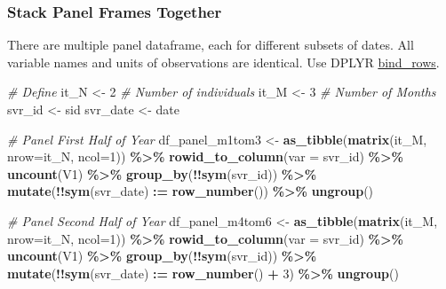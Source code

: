 \documentclass[
]{book}
\newenvironment{Shaded}{\begin{snugshade}}{\end{snugshade}}
\newcommand{\CommentTok}[1]{\textcolor[rgb]{0.56,0.35,0.01}{\textit{#1}}}
\newcommand{\DataTypeTok}[1]{\textcolor[rgb]{0.13,0.29,0.53}{#1}}
\newcommand{\DecValTok}[1]{\textcolor[rgb]{0.00,0.00,0.81}{#1}}
\newcommand{\ErrorTok}[1]{\textcolor[rgb]{0.64,0.00,0.00}{\textbf{#1}}}
\newcommand{\KeywordTok}[1]{\textcolor[rgb]{0.13,0.29,0.53}{\textbf{#1}}}
\newcommand{\NormalTok}[1]{#1}
\newcommand{\OperatorTok}[1]{\textcolor[rgb]{0.81,0.36,0.00}{\textbf{#1}}}
\newcommand{\StringTok}[1]{\textcolor[rgb]{0.31,0.60,0.02}{#1}}
\begin{document}
\hypertarget{stack-panel-frames-together}{%
\subsubsection{Stack Panel Frames Together}\label{stack-panel-frames-together}}

There are multiple panel dataframe, each for different subsets of dates. All variable names and units of observations are identical. Use DPLYR \href{https://dplyr.tidyverse.org/reference/bind.html}{bind\_rows}.

\begin{Shaded}
\begin{Highlighting}[]
\CommentTok{\# Define}
\NormalTok{it\_N \textless{}{-}}\StringTok{ }\DecValTok{2} \CommentTok{\# Number of individuals}
\NormalTok{it\_M \textless{}{-}}\StringTok{ }\DecValTok{3} \CommentTok{\# Number of Months}
\NormalTok{svr\_id \textless{}{-}}\StringTok{ \textquotesingle{}sid\textquotesingle{}}
\NormalTok{svr\_date \textless{}{-}}\StringTok{ \textquotesingle{}date\textquotesingle{}}

\CommentTok{\# Panel First Half of Year}
\NormalTok{df\_panel\_m1tom3 \textless{}{-}}\StringTok{ }\KeywordTok{as\_tibble}\NormalTok{(}\KeywordTok{matrix}\NormalTok{(it\_M, }\DataTypeTok{nrow=}\NormalTok{it\_N, }\DataTypeTok{ncol=}\DecValTok{1}\NormalTok{)) }\OperatorTok{\%\textgreater{}\%}
\StringTok{  }\KeywordTok{rowid\_to\_column}\NormalTok{(}\DataTypeTok{var =}\NormalTok{ svr\_id) }\OperatorTok{\%\textgreater{}\%}
\StringTok{  }\KeywordTok{uncount}\NormalTok{(V1) }\OperatorTok{\%\textgreater{}\%}
\StringTok{  }\KeywordTok{group\_by}\NormalTok{(}\OperatorTok{!!}\KeywordTok{sym}\NormalTok{(svr\_id)) }\OperatorTok{\%\textgreater{}\%}\StringTok{ }\KeywordTok{mutate}\NormalTok{(}\OperatorTok{!!}\KeywordTok{sym}\NormalTok{(svr\_date) }\OperatorTok{:}\ErrorTok{=}\StringTok{ }\KeywordTok{row\_number}\NormalTok{()) }\OperatorTok{\%\textgreater{}\%}
\StringTok{  }\KeywordTok{ungroup}\NormalTok{()}

\CommentTok{\# Panel Second Half of Year}
\NormalTok{df\_panel\_m4tom6 \textless{}{-}}\StringTok{ }\KeywordTok{as\_tibble}\NormalTok{(}\KeywordTok{matrix}\NormalTok{(it\_M, }\DataTypeTok{nrow=}\NormalTok{it\_N, }\DataTypeTok{ncol=}\DecValTok{1}\NormalTok{)) }\OperatorTok{\%\textgreater{}\%}
\StringTok{  }\KeywordTok{rowid\_to\_column}\NormalTok{(}\DataTypeTok{var =}\NormalTok{ svr\_id) }\OperatorTok{\%\textgreater{}\%}
\StringTok{  }\KeywordTok{uncount}\NormalTok{(V1) }\OperatorTok{\%\textgreater{}\%}
\StringTok{  }\KeywordTok{group\_by}\NormalTok{(}\OperatorTok{!!}\KeywordTok{sym}\NormalTok{(svr\_id)) }\OperatorTok{\%\textgreater{}\%}\StringTok{ }\KeywordTok{mutate}\NormalTok{(}\OperatorTok{!!}\KeywordTok{sym}\NormalTok{(svr\_date) }\OperatorTok{:}\ErrorTok{=}\StringTok{ }\KeywordTok{row\_number}\NormalTok{() }\OperatorTok{+}\StringTok{ }\DecValTok{3}\NormalTok{) }\OperatorTok{\%\textgreater{}\%}
\StringTok{  }\KeywordTok{ungroup}\NormalTok{()}


\end{Highlighting}
\end{Shaded}
\end{document}
